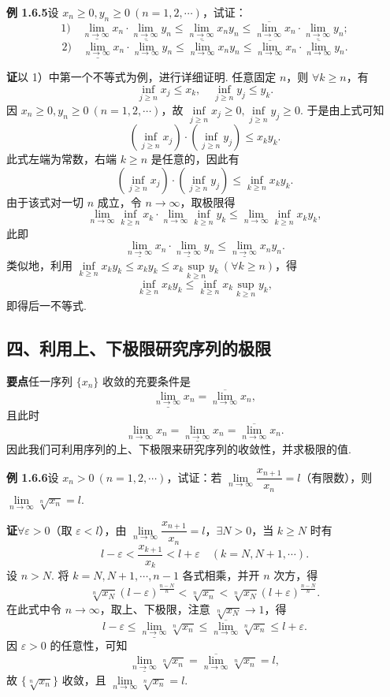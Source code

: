 \documentclass[UTF8,12pt,a4paper,fontset=fandol]{ctexart}
\begin{document}
\noindent\textbf{例 1.6.5}\quad 设 $x_n\ge0,y_n\ge0\ (n=1,2,\cdots)$，试证：
\[
  1)\quad
  \underline{\lim_{n\to\infty}}x_n\cdot\underline{\lim_{n\to\infty}}y_n
  \le \underline{\lim_{n\to\infty}}x_ny_n
  \le \overline{\lim_{n\to\infty}}x_n\cdot\underline{\lim_{n\to\infty}}y_n;
\]
\[
  2)\quad
  \underline{\lim_{n\to\infty}}x_n\cdot\overline{\lim_{n\to\infty}}y_n
  \le \overline{\lim_{n\to\infty}}x_ny_n
  \le \overline{\lim_{n\to\infty}}x_n\cdot\overline{\lim_{n\to\infty}}y_n.
\]

\noindent\textbf{证}\quad 以 1）中第一个不等式为例，进行详细证明.
任意固定 $n$，则 $\forall k\ge n$，有
\[
  \inf_{j\ge n}x_j\le x_k,\quad \inf_{j\ge n}y_j\le y_k.
\]
因 $x_n\ge0,y_n\ge0\ (n=1,2,\cdots)$，故 $\inf\limits_{j\ge n}x_j\ge0,\inf\limits_{j\ge n}y_j\ge0$. 于是由上式可知
\[
  \left(\inf_{j\ge n}x_j\right)\cdot\left(\inf_{j\ge n}y_j\right)\le x_ky_k.
\]
此式左端为常数，右端 $k\ge n$ 是任意的，因此有
\[
  \left(\inf_{j\ge n}x_j\right)\cdot\left(\inf_{j\ge n}y_j\right)
  \le \inf_{k\ge n}x_ky_k.
\]
由于该式对一切 $n$ 成立，令 $n\to\infty$，取极限得
\[
  \lim_{n\to\infty}\inf_{k\ge n}x_k\cdot\lim_{n\to\infty}\inf_{k\ge n}y_k
  \le \lim_{n\to\infty}\inf_{k\ge n}x_ky_k,
\]
此即
\[
  \underline{\lim_{n\to\infty}}x_n\cdot \underline{\lim_{n\to\infty}}y_n
  \le \underline{\lim_{n\to\infty}}x_ny_n.
\]
类似地，利用 $\inf\limits_{k\ge n}x_ky_k\le x_k y_k\le x_k\sup\limits_{k\ge n}y_k\ (\forall k\ge n)$，得
\[
  \inf_{k\ge n}x_ky_k\le \inf_{k\ge n}x_k\sup_{k\ge n}y_k,
\]
即得后一不等式.

\subsection*{四、利用上、下极限研究序列的极限}

\noindent\textbf{要点}\quad 任一序列 $\{x_n\}$ 收敛的充要条件是
\[
  \underline{\lim_{n\to\infty}}x_n=\overline{\lim_{n\to\infty}}x_n,
\]
且此时
\[
  \lim_{n\to\infty}x_n=\underline{\lim_{n\to\infty}}x_n=\overline{\lim_{n\to\infty}}x_n.
\]
因此我们可利用序列的上、下极限来研究序列的收敛性，并求极限的值.

\noindent\textbf{例 1.6.6}\quad 设 $x_n>0\ (n=1,2,\cdots)$，试证：若 $\lim\limits_{n\to\infty}\dfrac{x_{n+1}}{x_n}=l$（有限数），则 $\lim\limits_{n\to\infty}\sqrt[n]{x_n}=l$.

\noindent\textbf{证}\quad $\forall \varepsilon>0$（取 $\varepsilon<l$），由 $\lim\limits_{n\to\infty}\dfrac{x_{n+1}}{x_n}=l$，$\exists N>0$，当 $k\ge N$ 时有
\[
  l-\varepsilon<\frac{x_{k+1}}{x_k}<l+\varepsilon\quad(k=N,N+1,\cdots).
\]
设 $n>N$. 将 $k=N,N+1,\cdots,n-1$ 各式相乘，并开 $n$ 次方，得
\[
  \sqrt[n]{x_N}(l-\varepsilon)^{\frac{n-N}{n}}
  <\sqrt[n]{x_n}
  <\sqrt[n]{x_N}(l+\varepsilon)^{\frac{n-N}{n}}.
\]
在此式中令 $n\to\infty$，取上、下极限，注意 $\sqrt[n]{x_N}\to1$，得
\[
  l-\varepsilon\le \underline{\lim_{n\to\infty}}\sqrt[n]{x_n}
  \le \overline{\lim_{n\to\infty}}\sqrt[n]{x_n}\le l+\varepsilon.
\]
因 $\varepsilon>0$ 的任意性，可知
\[
  \underline{\lim_{n\to\infty}}\sqrt[n]{x_n}
  =\overline{\lim_{n\to\infty}}\sqrt[n]{x_n}=l,
\]
故 $\{\sqrt[n]{x_n}\}$ 收敛，且 $\lim\limits_{n\to\infty}\sqrt[n]{x_n}=l$.
\end{document}

